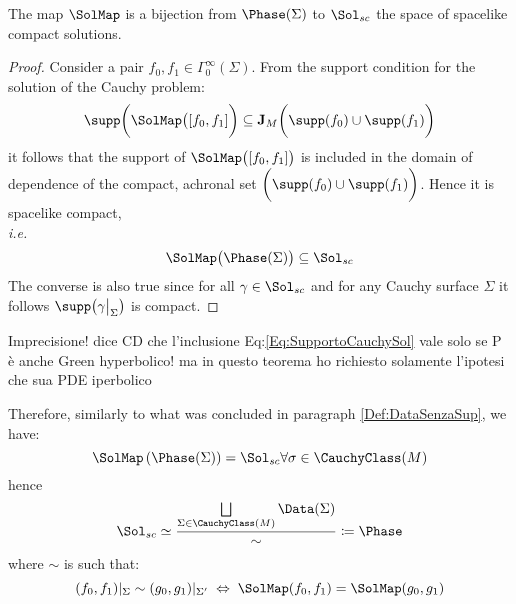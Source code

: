 \documentclass[Main]{subfiles}
\begin{document}
			\begin{proposition}
				The map $\SolMap$ is a bijection from $\Phase(\Sigma)$ to $\Sol_{sc}$ the space of spacelike compact solutions.
			\end{proposition}
			\begin{proof}
				Consider a pair $f_0, f_1 \in \Gamma_0^\infty(\Sigma)$. From the support condition for the solution of the Cauchy problem:
				\begin{equation}\label{Eq:SupportoCauchySol}
					\supp\biggr( \SolMap \big([f_0,f_1] \biggr) \subseteq \mathbf{J}_M \biggr( \supp(f_0) \cup \supp(f_1) \biggr)
				\end{equation}
				it follows that the support of $\SolMap \big([f_0,f_1]\big) $	is included in the domain of dependence of the compact, achronal	set $\biggr( \supp(f_0) \cup \supp(f_1) \biggr)$.
				Hence it is spacelike compact,\\ \textit{i.e.}
				\begin{displaymath}
					\SolMap \big( \Phase(\Sigma)\big) \subseteq \Sol_{sc}
				\end{displaymath}
				The converse is also true since for all $\gamma \in \Sol_{sc}$ and for any Cauchy surface $\Sigma$ it follows $\supp\big( \gamma \big\vert_\Sigma \big)$ is compact.
			\end{proof}
%
\ifToninus
	\begin{Warning}
		Imprecisione! dice CD che l'inclusione Eq:\ref{Eq:SupportoCauchySol} vale solo se P è anche Green hyperbolico! ma in questo teorema ho richiesto solamente l'ipotesi che sua PDE iperbolico
	\end{Warning}
\fi
%
			Therefore, similarly to what was concluded in paragraph  \ref{Def:DataSenzaSup}, we have:
			\begin{displaymath}
			\SolMap \left( \Phase(\Sigma) \right) = \Sol_{sc} \forall \sigma \in \CauchyClass(M)
			\end{displaymath}
			hence
			\begin{equation}
				\Sol_{sc} \simeq \frac{\bigsqcup\limits_{\Sigma \in \CauchyClass(M)}\Data(\Sigma)}{\sim} \coloneqq \Phase
			\end{equation}
				where $\sim$ is such that:
				\begin{displaymath}
					(f_0, f_1)|_\Sigma \sim (g_0, g_1)|_{\Sigma'} \; \Leftrightarrow \; \SolMap(f_0,f_1) =  \SolMap(g_0,g_1)
				\end{displaymath}
\end{document}
